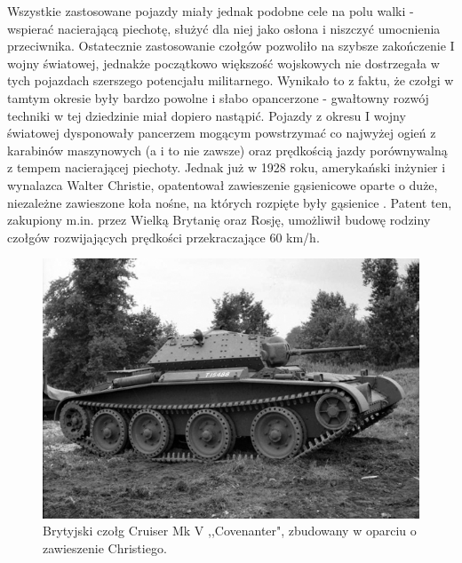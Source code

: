 Wszystkie zastosowane pojazdy miały jednak podobne cele na polu walki - wspierać nacierającą piechotę, służyć dla niej jako osłona i niszczyć umocnienia przeciwnika. Ostatecznie zastosowanie czołgów pozwoliło na szybsze zakończenie I wojny światowej, jednakże początkowo większość wojskowych nie dostrzegała w tych pojazdach szerszego potencjału militarnego. Wynikało to z faktu, że czołgi w tamtym okresie były bardzo powolne i słabo opancerzone - gwałtowny rozwój techniki w tej dziedzinie miał dopiero nastąpić. Pojazdy z okresu I wojny światowej dysponowały pancerzem mogącym powstrzymać co najwyżej ogień z karabinów maszynowych (a i to nie zawsze) oraz prędkością jazdy porównywalną z tempem nacierającej piechoty. Jednak już w 1928 roku, amerykański inżynier i wynalazca Walter Christie, opatentował zawieszenie gąsienicowe oparte o duże, niezależne zawieszone koła nośne, na których rozpięte były gąsienice \cite{wojna_pancerna}. Patent ten, zakupiony m.in. przez Wielką Brytanię oraz Rosję, umożliwił budowę rodziny czołgów rozwijających prędkości przekraczające 60 km/h.

  \begin{figure}[H]
    \begin{center}
\includegraphics[scale=0.4]{imgs/covenanter.jpg}
 \caption[Czołg \textit{Cruiser Mk V ,,Covenanter"}]{\small{Brytyjski czołg Cruiser Mk V ,,Covenanter", zbudowany w oparciu o zawieszenie Christiego.}\footnotemark[7]}
        \label{covenanter}
    \end{center}
  \end{figure}


